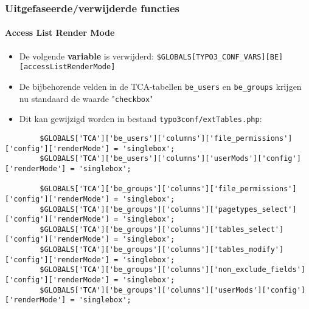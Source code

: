 
\begin{frame}[fragile]
	\frametitle{Uitgefaseerde/verwijderde functies}
	\framesubtitle{Access List Render Mode}

	\lstset{basicstyle=\tiny\ttfamily}

	\begin{itemize}

		\item De volgende \textbf{variable} is verwijderd:
			\small\texttt{\$GLOBALS[TYPO3\_CONF\_VARS][BE][accessListRenderMode]}\normalsize

		\item De bijbehorende velden in de TCA-tabellen \texttt{be\_users} en \texttt{be\_groups}
			krijgen nu standaard de waarde "\texttt{checkbox}"

		\item Dit kan gewijzigd worden in bestand \texttt{typo3conf/extTables.php}:

	\end{itemize}

	\begin{lstlisting}
		$GLOBALS['TCA']['be_users']['columns']['file_permissions']['config']['renderMode'] = 'singlebox';
		$GLOBALS['TCA']['be_users']['columns']['userMods']['config']['renderMode'] = 'singlebox';

		$GLOBALS['TCA']['be_groups']['columns']['file_permissions']['config']['renderMode'] = 'singlebox';
		$GLOBALS['TCA']['be_groups']['columns']['pagetypes_select']['config']['renderMode'] = 'singlebox';
		$GLOBALS['TCA']['be_groups']['columns']['tables_select']['config']['renderMode'] = 'singlebox';
		$GLOBALS['TCA']['be_groups']['columns']['tables_modify']['config']['renderMode'] = 'singlebox';
		$GLOBALS['TCA']['be_groups']['columns']['non_exclude_fields']['config']['renderMode'] = 'singlebox';
		$GLOBALS['TCA']['be_groups']['columns']['userMods']['config']['renderMode'] = 'singlebox';
	\end{lstlisting}

\end{frame}


